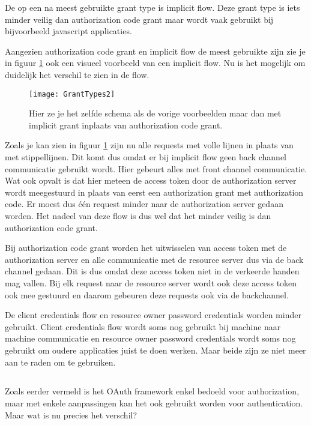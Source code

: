 De op een na meest gebruikte grant type is implicit flow. Deze grant type is iets minder veilig dan authorization code grant maar wordt vaak gebruikt bij bijvoorbeeld javascript applicaties. 

Aangezien authorization code grant en implicit flow de meest gebruikte zijn zie je in figuur \ref{fig:grantTypes2} ook een visueel voorbeeld van een implicit flow. Nu is het mogelijk om duidelijk het verschil te zien in de flow.
\begin{figure}[H]
	\centering
	\texttt{[image: GrantTypes2]} 
	\caption[Visuele voorstelling van implicit grant]{Hier ze je het zelfde schema als de vorige voorbeelden maar dan met implicit grant inplaats van authorization code grant.}
	\label{fig:grantTypes2}
\end{figure}
Zoals je kan zien in figuur \ref{fig:grantTypes2} zijn nu alle requests met volle lijnen in plaats van met stippellijnen. Dit komt dus omdat er bij implicit flow geen back channel communicatie gebruikt wordt. Hier gebeurt alles met front channel communicatie. Wat ook opvalt is dat hier meteen de access token door de authorization server wordt meegestuurd in plaats van eerst een authorization grant met authorization code. Er moest dus één request minder naar de authorization server gedaan worden. Het nadeel van deze flow is dus wel dat het minder veilig is dan authorization code grant. 

Bij authorization code grant worden het uitwisselen van access token met de authorization server en alle communicatie met de resource server dus via de back channel gedaan. Dit is dus omdat deze access token niet in de verkeerde handen mag vallen. Bij elk request naar de resource server wordt ook deze access token ook mee gestuurd en daarom gebeuren deze requests ook via de backchannel.

De client credentials flow en resource owner password credentials worden minder gebruikt. Client credentials flow wordt soms nog gebruikt bij machine naar machine communicatie en resource owner password credentials wordt soms nog gebruikt om oudere applicaties juist te doen werken. Maar beide zijn ze niet meer aan te raden om te gebruiken.

\subsection{}
Zoals eerder vermeld is het OAuth framework enkel bedoeld voor authorization, maar met enkele aanpassingen kan het ook gebruikt worden voor authentication. Maar wat is nu precies het verschil?


